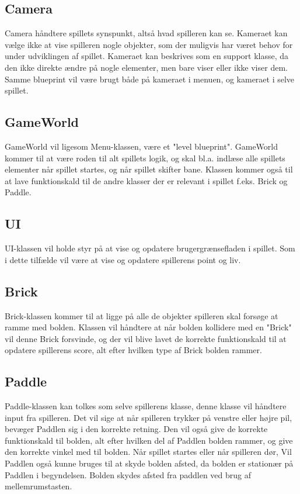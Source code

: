 \subsection{Camera}
Camera håndtere spillets synspunkt, altså hvad spilleren kan se. Kameraet kan vælge ikke at vise spilleren nogle objekter, som der muligvis har været behov for under udviklingen af spillet. Kameraet kan beskrives som en support klasse, da den ikke direkte ændre på nogle elementer, men bare viser eller ikke viser dem. Samme blueprint vil være brugt både på kameraet i menuen, og kameraet i selve spillet.

\subsection{GameWorld}
GameWorld vil ligesom Menu-klassen, være et "level blueprint". GameWorld kommer til at være roden til alt spillets logik, og skal bl.a. indlæse alle spillets elementer når spillet startes, og når spillet skifter bane. Klassen kommer også til at lave funktionskald til de andre klasser der er relevant i spillet f.eks. Brick og Paddle.

\subsection{UI}
UI-klassen vil holde styr på at vise og opdatere brugergrænsefladen i spillet. 
Som i dette tilfælde vil være at vise og opdatere spillerens point og liv.

\subsection{Brick}
Brick-klassen kommer til at ligge på alle de objekter spilleren skal forsøge at ramme med bolden. Klassen vil håndtere at når bolden kollidere med en "Brick" vil denne Brick forsvinde, og der vil blive lavet de korrekte funktionskald til at opdatere spillerens score, alt efter hvilken type af Brick bolden rammer.

\subsection{Paddle}
Paddle-klassen kan tolkes som selve spillerens klasse, denne klasse vil håndtere input fra spilleren. Det vil sige at når spilleren trykker på venstre eller højre pil, bevæger Paddlen sig i den korrekte retning. Den vil også give de korrekte funktionskald til bolden, alt efter hvilken del af Paddlen bolden rammer, og give den korrekte vinkel med til bolden. Når spillet startes eller når spilleren dør, Vil Paddlen også kunne bruges til at skyde bolden afsted, da bolden er stationær på Paddlen i begyndelsen. Bolden skydes afsted fra paddlen ved brug af mellemrumstasten. 

